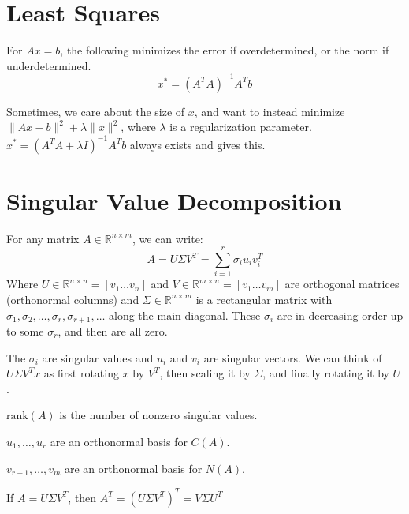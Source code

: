 \documentclass[10pt]{extarticle}
\newcommand{\R}{\mathbb{R}}
\begin{document}
\begin{multicols*}{2}
\section{Least Squares}
For $Ax = b$, the following minimizes the error if overdetermined, or the norm if underdetermined.
\[ x^* = (A^T A)^{-1} A^T b\]

Sometimes, we care about the size of $x$, and want to instead minimize $\|Ax-b\|^2 + \lambda \|x\|^2$, where $\lambda$ is a regularization parameter. $x^* = (A^T A + \lambda I)^{-1} A^T b$ always exists and gives this.

\section{Singular Value Decomposition}
For any matrix $A \in \R^{n\times m}$, we can write:
\[ A = U\Sigma V^T = \sum_{i=1}^r \sigma_i u_i v_i^T\]
Where $U \in \R^{n \times n} = [v_1\ldots v_n]$ and $V \in \R^{m \times n} = [v_1 \ldots v_m]$ are orthogonal matrices (orthonormal columns) and $\Sigma \in \R^{n \times m}$ is a rectangular matrix with $\sigma_1, \sigma_2, \ldots, \sigma_r, \sigma_{r+1}, \ldots$ along the main diagonal. These $\sigma_i$ are in decreasing order up to some $\sigma_r$, and then are all zero.

The $\sigma_i$ are singular values and $u_i$ and $v_i$ are singular vectors. 
We can think of $U\Sigma V^T x$ as first rotating $x$ by $V^T$, then scaling it by $\Sigma$, and finally rotating it by $U$.

\begin{compactitem}
\item $\text{rank}(A)$ is the number of nonzero singular values.	
\item $u_1, \ldots, u_r$ are an orthonormal basis for $C(A)$.
\item $v_{r+1}, \ldots, v_m$ are an orthonormal basis for $N(A)$.
\item If $A = U\Sigma V^T$, then $A^T = (U\Sigma V^T)^T = V\Sigma U^T$
\end{compactitem}


\end{multicols*}
\end{document}

